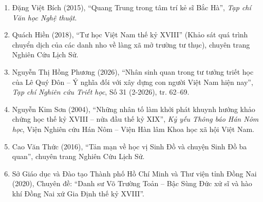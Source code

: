 \begin{enumerate}
    \item Đặng Việt Bích (2015), ``Quang Trung trong tâm trí kẻ sĩ Bắc Hà'', \textit{Tạp chí Văn học Nghệ thuật}.
    \item Quách Hiền (2018), ``Tư học Việt Nam thế kỷ XVIII'' (Khảo sát quá trình chuyển dịch của các danh nho về làng xã mở trường tư thục), chuyên trang Nghiên Cứu Lịch Sử.
    \item Nguyễn Thị Hồng Phương (2026), ``Nhân sinh quan trong tư tưởng triết học của Lê Quý Đôn -- Ý nghĩa đối với xây dựng con người Việt Nam hiện nay'', \textit{Tạp chí Nghiên cứu Triết học}, Số 31 (2-2026), tr. 62--69.
    \item Nguyễn Kim Sơn (2004), ``Những nhân tố làm khởi phát khuynh hướng khảo chứng học thế kỷ XVIII -- nửa đầu thế kỷ XIX'', \textit{Kỷ yếu Thông báo Hán Nôm học}, Viện Nghiên cứu Hán Nôm -- Viện Hàn lâm Khoa học xã hội Việt Nam.
    \item Cao Văn Thức (2016), ``Tản mạn về học vị Sinh Đồ và chuyện Sinh Đồ ba quan'', chuyên trang Nghiên Cứu Lịch Sử.
    \item Sở Giáo dục và Đào tạo Thành phố Hồ Chí Minh và Thư viện tỉnh Đồng Nai (2020), Chuyên đề: ``Danh sư Võ Trường Toản -- Bậc Sùng Đức xử sĩ và hào khí Đồng Nai xứ Gia Định thế kỷ XVIII''.
\end{enumerate}
